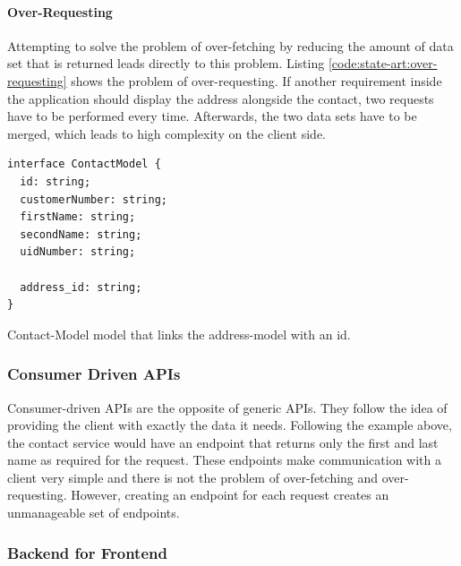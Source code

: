 \documentclass[MSE,Master,english]{twbook}%
\begin{document}
\paragraph{Over-Requesting}

Attempting to solve the problem of over-fetching by reducing the amount of data set that is returned leads directly to this problem. Listing \ref{code:state-art:over-requesting} shows the problem of over-requesting. If another requirement inside the application should display the address alongside the contact, two requests have to be performed every time. Afterwards, the two data sets have to be merged, which leads to high complexity on the client side. \cite{misc:2019:leitner:backend-for-frontends}

\ifshowListings
\begin{listing}[H]
\begin{verbatim}
interface ContactModel {
  id: string;
  customerNumber: string;
  firstName: string;
  secondName: string;
  uidNumber: string;

  address_id: string;
}
\end{verbatim}
\caption{Contact-Model model that links the address-model with an id.}\label{code:state-art:over-requesting}
\end{listing}
\fi

\subsubsection{Consumer Driven APIs}

Consumer-driven APIs are the opposite of generic APIs. They follow the idea of providing the client with exactly the data it needs. Following the example above, the contact service would have an endpoint that returns only the first and last name as required for the request. These endpoints make communication with a client very simple and there is not the problem of over-fetching and over-requesting. However, creating an endpoint for each request creates an unmanageable set of endpoints. \cite{misc:2019:leitner:backend-for-frontends}

\subsubsection{Backend for Frontend}

\ifshowUnusedContent
\end{document}
